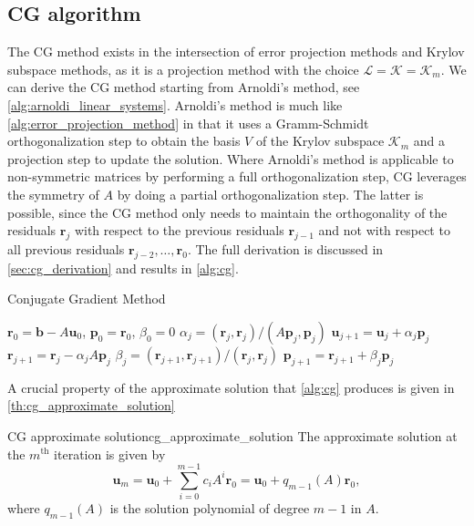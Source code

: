\subsection{CG algorithm}
The CG method exists in the intersection of error projection methods and Krylov subspace methods, as it is a projection method with the choice $\mathcal{L} = \mathcal{K} = \mathcal{K}_m$. We can derive the CG method starting from Arnoldi's method, see \cref{alg:arnoldi_linear_systems}. Arnoldi's method is much like \cref{alg:error_projection_method} in that it uses a Gramm-Schmidt orthogonalization step to obtain the basis $V$ of the Krylov subspace $\mathcal{K}_m$ and a projection step to update the solution. Where Arnoldi's method is applicable to non-symmetric matrices by performing a full orthogonalization step, CG leverages the symmetry of $A$ by doing a partial orthogonalization step. The latter is possible, since the CG method only needs to maintain the orthogonality of the residuals $\mathbf{r}_j$ with respect to the previous residuals $\mathbf{r}_{j-1}$ and not with respect to all previous residuals $\mathbf{r}_{j-2}, \dots, \mathbf{r}_0$. The full derivation is discussed in \cref{sec:cg_derivation} and results in \cref{alg:cg}.
\begin{algorithm}[H]
  \caption{Conjugate Gradient Method}
  \begin{algorithmic}
    \State $\mathbf{r}_0 = \mathbf{b} - A\mathbf{u}_0$, $\mathbf{p}_0 = \mathbf{r}_0$, $\beta_0 = 0$
    \State $\alpha_j = (\mathbf{r}_j, \mathbf{r}_j) / (A \mathbf{p}_j, \mathbf{p}_j)$
    \State $\mathbf{u}_{j+1} = \mathbf{u}_j + \alpha_j \mathbf{p}_j$
    \State $\mathbf{r}_{j+1} = \mathbf{r}_j - \alpha_j A \mathbf{p}_j$
    \State $\beta_j = (\mathbf{r}_{j+1}, \mathbf{r}_{j+1}) / (\mathbf{r}_j, \mathbf{r}_j)$
    \State $\mathbf{p}_{j+1} = \mathbf{r}_{j+1} + \beta_j \mathbf{p}_j$
    \EndFor
  \end{algorithmic}
  \label{alg:cg}
\end{algorithm}
A crucial property of the approximate solution that \cref{alg:cg} produces is given in \cref{th:cg_approximate_solution}
\begin{fancyth}{CG approximate solution}{cg_approximate_solution}
  The approximate solution at the $m^{\text{th}}$ iteration is given by
  \begin{equation}
    \mathbf{u}_m = \mathbf{u}_0 + \sum_{i=0}^{m-1} c_i A^i \mathbf{r}_0 = \mathbf{u}_0 + q_{m-1}(A)\mathbf{r}_0,
    \label{eq:cg_approximate_solution}
  \end{equation}
where $q_{m-1}(A)$ is the solution polynomial of degree $m-1$ in $A$.
\end{fancyth}
